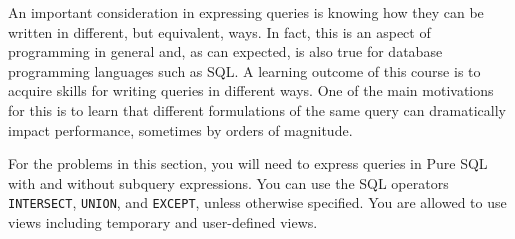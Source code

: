 \documentclass[11pt]{article}
\begin{document}
An important consideration in expressing queries is knowing how they can be written in different, but equivalent, ways. In fact, this is an aspect of programming in general and, as can expected, is also true for database programming languages such as SQL.   A learning outcome of this course
is to acquire skills for writing queries in different ways.    One of the main motivations for this is to learn that different formulations of the same query can dramatically impact performance, sometimes by orders of magnitude.    


For the problems in this section, you will need to express  queries in {Pure SQL} with and without subquery expressions.
You can use the SQL operators {\tt INTERSECT}, {\tt UNION}, and {\tt EXCEPT}, unless otherwise specified.
You are allowed to use views including temporary and user-defined views.
\end{document}

